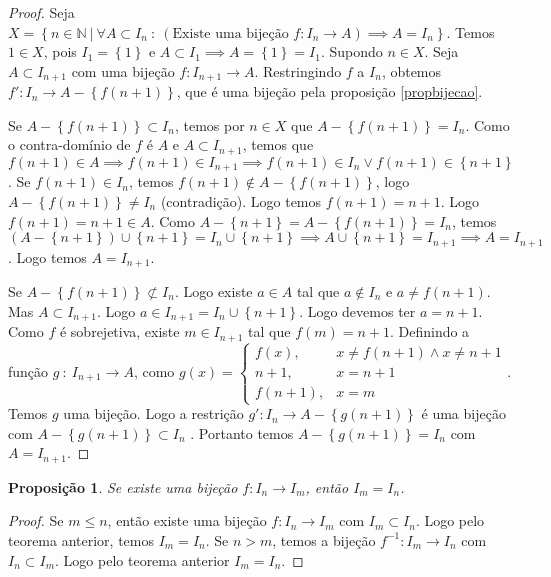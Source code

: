 \documentclass{article}
\newtheorem{prop}{Proposição}[section]
\theoremstyle{theorem}
\theoremstyle{lemma}
\theoremstyle{definition}
\theoremstyle{remark}
\begin{document}
\begin{proof}
	Seja $X = \left\{n \in \mathbb{N} \: | \: \forall A \subset I_n \: : \: (\text{Existe uma bijeção } f:  I_n \to A ) \implies A = I_n \right\}$. Temos $1\in X$, pois  $I_1 = \left\{1\right\}$ e $A\subset I_1 \implies A = \left\{1\right\}  = I_1$. Supondo $n\in X$.  Seja $A\subset I_{n+1}$ com uma bijeção $f:I_{n+1} \to A$. Restringindo $f$ a $I_n$, obtemos $f': I_n \to A-\left\{f(n+1)\right\}$, que é uma bijeção pela proposição \ref{propbijecao}.

	Se $A - \left\{f(n+1) \right\} \subset I_n$, temos por $n\in X$ que $A-\left\{f(n+1)\right\} = I_n$. Como o contra-domínio de $f$ é $A$ e $A\subset I_{n+1}$, temos que $f(n+1)\in A \implies f(n+1) \in I_{n+1} \implies f(n+1) \in I_n \lor f(n+1)\in \left\{n+1\right\} $. Se $f(n+1) \in I_n$, temos $f(n+1)\not \in A-\left\{f(n+1)\right\}$, logo $A - \left\{ f(n+1) \right\} \neq I_n$ (contradição). Logo temos $f(n+1) = n+1$. Logo $ f(n+1) = n+1 \in A$. Como $ A - \left\{ n+1\right\} = A -\left\{ f(n+1) \right\}  = I_n$, temos $ (A - \left\{ n+1\right\}) \cup \left\{n+1\right\} =   I_n\cup\left\{n+1\right\} \implies A\cup \left\{n+1\right\} = I_{n+1} \implies A = I_{n+1}$. Logo temos $A = I_{n+1}$.


	Se $A - \left\{f(n+1)\right\} \not \subset I_n$. Logo existe $a\in A$ tal que $a\not \in I_n$ e $a\neq f(n+1)$. Mas $A\subset I_{n+1}$. Logo $a\in I_{n+1} = I_n \cup \left\{n+1\right\}$. Logo devemos ter $a  =n+1$. Como $f$ é sobrejetiva, existe $m\in I_{n+1}$ tal que $f(m) = n+1$. Definindo a função $g \: : \: I_{n+1} \to A$, como $g(x) = \begin{cases}
		f(x), &x\neq f(n+1) \land x \neq n+1\\
		n+1, &x = n+1 \\
		f(n+1), &x = m
	\end{cases}$. Temos $g$ uma bijeção. Logo a restrição $g': I_n \to A-\left\{g(n+1) \right\}$ é uma bijeção com $A - \left\{g(n+1) \right\} \subset I_n$ . Portanto temos $A - \left\{g(n+1)\right\} = I_n$ com $A = I_{n+1}$. 
\end{proof}
\begin{prop}
	Se existe uma bijeção $f: I_n \to I_m$, então $I_m = I_n$.
\end{prop}
\begin{proof}
	Se $m\leq n$, então existe uma bijeção $f:I_n \to I_m$ com $I_m \subset I_n$. Logo pelo teorema anterior, temos $I_m = I_n$. Se $n > m$, temos a bijeção $f^{-1}: I_m \to I_n$ com $I_n \subset I_m$. Logo pelo teorema anterior $I_m = I_n$.
\end{proof}
\end{document}
